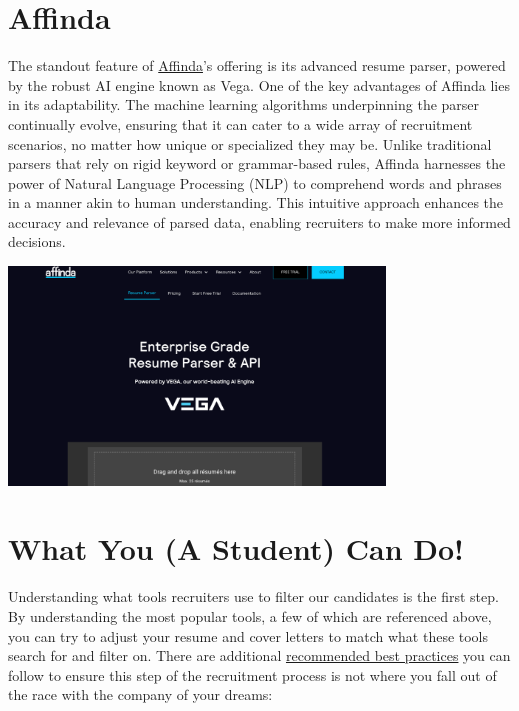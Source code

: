 \documentclass[
]{book}
\begin{document}
\hypertarget{affinda}{%
\section{Affinda}\label{affinda}}

The standout feature of \href{https://www.affinda.com/resume-parser}{Affinda}'s offering is its advanced resume parser, powered by the robust AI engine known as Vega. One of the key advantages of Affinda lies in its adaptability. The machine learning algorithms underpinning the parser continually evolve, ensuring that it can cater to a wide array of recruitment scenarios, no matter how unique or specialized they may be. Unlike traditional parsers that rely on rigid keyword or grammar-based rules, Affinda harnesses the power of Natural Language Processing (NLP) to comprehend words and phrases in a manner akin to human understanding. This intuitive approach enhances the accuracy and relevance of parsed data, enabling recruiters to make more informed decisions.

\includegraphics[width=3.9375in,height=\textheight]{affinda pic.png}

\hypertarget{what-you-a-student-can-do-1}{%
\section{What You (A Student) Can Do!}\label{what-you-a-student-can-do-1}}

Understanding what tools recruiters use to filter our candidates is the first step. By understanding the most popular tools, a few of which are referenced above, you can try to adjust your resume and cover letters to match what these tools search for and filter on. There are additional \href{https://www.indeed.com/career-advice/resumes-cover-letters/resume-ai\#:~:text=Instead\%20of\%20using\%20a\%20visual,this\%20kind\%20of\%20complex\%20information.}{recommended best practices} you can follow to ensure this step of the recruitment process is not where you fall out of the race with the company of your dreams:
\end{document}
